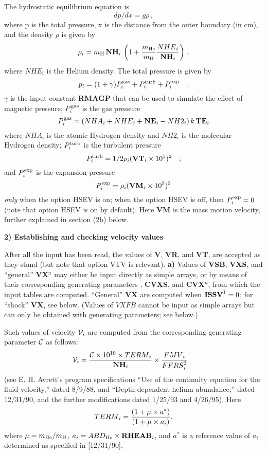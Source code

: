 The hydrostatic equilibrium equation is
$$ dp/dx = g\rho \, , $$
where p is the total pressure, x is the distance from the outer boundary (in cm),
and the density $\rho$ is given by
$$ \rho_i = m_{\rm H} \, {\bf NH}_i \, \left( 1 + { m_{\rm He} \over m_{\rm H} } 
           { {NHE}_i \over {\bf NH}_i }\right) \, , $$
where ${NHE}_i$ is the Helium density. The total pressure is given by
$$ p_i = ( 1 + \gamma ) P^{\rm gas}_i + P^{\rm turb}_i + P^{\rm exp}_i \quad . $$
$\gamma$ is the input constant {\bf RMAGP} that can be used
to simulate the effect of magnetic pressure; $P^{\rm gas}_i$ is the gas pressure
$$ P^{\rm gas}_i = ({NHA}_i + {NHE}_i + {\bf NE}_i - {NH2}_i ) \, k \, {\bf TE}_i $$
where ${NHA}_i$ is the atomic Hydrogen density and ${NH2}_i$ is the molecular
Hydrogen density; $P^{\rm turb}_i$ is the turbulent pressure
$$ P^{\rm turb}_i = { 1 / 2 } {\rho}_i ({\bf VT}_i \times 10^5)^2 \quad ; $$
and $P^{\rm exp}_i$ is the expansion pressure
$$ P^{\rm exp}_i = {\rho}_i ({\bf VM}_i \times 10^5)^2 $$
{\it only} when the option HSEV is on; when the option HSEV is off, then 
$P^{\rm exp}_i = 0$ (note that option HSEV is on by default). Here {\bf VM}
is the mass motion velocity, further explained in section (2b) below.
\ej
\centerline{{\bf  2) Establishing and checking velocity values}}
\blankline
After all the input has been read, the values of {\bf V}, {\bf VR}, and
{\bf VT}, are accepted as they stand (but note that option VTV is relevant). 
\blankline
{\bf a)} Values of {\bf VSB}, {\bf VXS}, and ``general'' {\bf VX}$^n$ may
either be input directly as simple arrays, or by means of their corresponding
generating parameters , {\bf CVXS}, and {\bf CVX}$^n$,
from which the input tables are computed. \break ``General'' {\bf VX} are
computed when ${\bf ISSV}^1 = 0$; for ``shock'' {\bf VX}, see below. \break
(Values of $VXFB$ cannot be input as simple arrays but can only be obtained
with generating parameters; see below.)

Such values of velocity
${\cal V}_i$ are computed from the corresponding generating parameter
$\cal C$ as follows:
$$ {\cal V}_i = { { {\cal C} \times 10^{10} \times {TERM}_i } \over 
                  {\bf NH}_i } \times { {FMV}_i \over {FFRS}^2_i } \quad $$
(see E. H. Avrett's program specifications ``Use of the continuity equation
for the fluid velocity,'' dated 8/9/88, and ``Depth-dependent helium
abundance,'' dated 12/31/90, and the further modifications dated 1/25/93 
and 4/26/95). Here 
$$ {TERM}_i = { {(1 + \mu \times a^*)} \over {(1 + \mu \times a_i)} } , $$
where $\mu = m_{\rm He} / m_{\rm H}$, $a_i = {ABD}_{\rm He}
\times {\bf RHEAB}_i$, and $a^*$ is a reference value of $a_i$ determined as
specified in [12/31/90].

